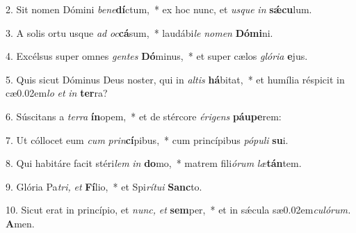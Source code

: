 \item 2. Sit nomen Dómini \textit{be}\textit{ne}\textbf{dí}ctum,~* ex hoc nunc, et \textit{usque} \textit{in} \textbf{sǽcu}lum.
\item 3. A solis ortu usque \textit{ad} \textit{oc}\textbf{cá}sum,~* laudábi\textit{le} \textit{nomen} \textbf{Dómi}ni.
\item 4. Excélsus super omnes \textit{gentes} \textbf{Dó}minus,~* et super cælos \textit{glória} \textbf{e}jus.
\item 5. Quis sicut Dóminus Deus noster, qui in \textit{altis} \textbf{há}bitat,~* et humília réspicit in cæ\kern0.02em\textit{lo} \textit{et} \textit{in} \textbf{ter}ra?
\item 6. Súscitans a \textit{terra} \textbf{ín}opem,~* et de stércore \textit{érigens} \textbf{páu}\textbf{pe}rem:
\item 7. Ut cóllocet eum \textit{cum} \textit{prin}\textbf{cí}pibus,~* cum princípibus \textit{pópuli} \textbf{su}i.
\item 8. Qui habitáre facit stéri\textit{lem} \textit{in} \textbf{do}mo,~* matrem fili\textit{órum} \textit{læ}\textbf{tán}tem.
\item 9. Glória Pa\hspace{0.03em}\textit{tri,} \textit{et} \textbf{Fí}lio,~* et Spi\textit{rítui} \textbf{Sanc}to.
\item 10. Sicut erat in princípio, et \textit{nunc,} \textit{et} \textbf{sem}per,~* et in sǽcula sæ\kern0.02em\textit{culórum.} \textbf{A}men.